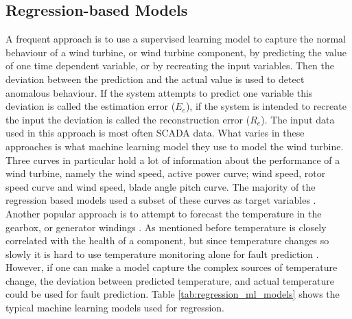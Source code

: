 \subsection{Regression-based Models} \label{sec:reg_bas_mod}
A frequent approach is to use a supervised learning model to capture the normal behaviour of a wind turbine, or wind turbine component, by predicting the value of one time dependent variable, or by recreating the input variables. 
Then the deviation between the prediction and the actual value is used to detect anomalous behaviour. 
If the system attempts to predict one variable this deviation is called the estimation error ($E_e$), if the system is intended to recreate the input the deviation is called the reconstruction error ($R_e$).
The input data used in this approach is most often SCADA data. 
What varies in these approaches is what machine learning model they use to model the wind turbine. 
Three curves in particular hold a lot of information about the performance of a wind turbine, namely the wind speed, active power curve; wind speed, rotor speed curve and wind speed, blade angle pitch curve. 
The majority of the regression based models used a subset of these curves as target variables \cite{perf_mon_of_wt_using_extreme_func_theory, GP_operational_curve_monitoring, high_freq_scada_perf_monit_sensitivity, abnormal_detection_scada_data_mining, improved_power_curve_monitoring_of_wt, SVR_blade_pitch_curve_cm, health_cond_model_nn_proportional_hazard_models}. 
Another popular approach is to attempt to forecast the temperature in the gearbox, or generator windings \cite{AD_and_fault_analysis_wt_DAE, health_cond_model_nn_proportional_hazard_models, detecting_malfunctions_wt_generator_bearings_generic_vs_specific_models, CBPM_ABPM_maintainance_model, wt_gearbox_bearing_temp_KS_CNN, DBN_chicken_swarm_optim}. 
As mentioned before temperature is closely correlated with the health of a component, but since temperature changes so slowly it is hard to use temperature monitoring alone for fault prediction \cite{wt_cm_rev_new_trends_chal_2014}. 
However, if one can make a model capture the complex sources of temperature change, the deviation between predicted temperature, and actual temperature could be used for fault prediction. 
Table \ref{tab:regression_ml_models} shows the typical machine learning models used for regression. 

